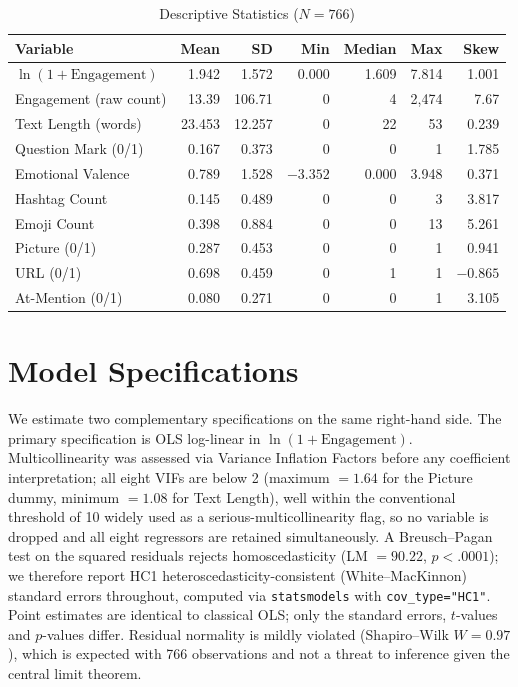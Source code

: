 \documentclass[12pt,a4paper]{article}
\begin{document}
\begin{table}[H]
\centering\small
\caption{Descriptive Statistics ($N=766$)}
\begin{tabular}{lrrrrrr}
\toprule
Variable & Mean & SD & Min & Median & Max & Skew \\
\midrule
$\ln(1+\text{Engagement})$ & 1.942 & 1.572 & 0.000 & 1.609 & 7.814 & 1.001 \\
Engagement (raw count) & 13.39 & 106.71 & 0 & 4 & 2{,}474 & 7.67 \\
Text Length (words) & 23.453 & 12.257 & 0 & 22 & 53 & 0.239 \\
Question Mark (0/1) & 0.167 & 0.373 & 0 & 0 & 1 & 1.785 \\
Emotional Valence & 0.789 & 1.528 & $-3.352$ & 0.000 & 3.948 & 0.371 \\
Hashtag Count & 0.145 & 0.489 & 0 & 0 & 3 & 3.817 \\
Emoji Count & 0.398 & 0.884 & 0 & 0 & 13 & 5.261 \\
Picture (0/1) & 0.287 & 0.453 & 0 & 0 & 1 & 0.941 \\
URL (0/1) & 0.698 & 0.459 & 0 & 1 & 1 & $-0.865$ \\
At-Mention (0/1) & 0.080 & 0.271 & 0 & 0 & 1 & 3.105 \\
\bottomrule
\end{tabular}
\end{table}

\section{Model Specifications}

We estimate two complementary specifications on the same right-hand side. The primary specification is OLS log-linear in $\ln(1+\text{Engagement})$. Multicollinearity was assessed via Variance Inflation Factors before any coefficient interpretation; all eight VIFs are below 2 (maximum $=1.64$ for the Picture dummy, minimum $=1.08$ for Text Length), well within the conventional threshold of 10 widely used as a serious-multicollinearity flag, so no variable is dropped and all eight regressors are retained simultaneously. A Breusch--Pagan test on the squared residuals rejects homoscedasticity (LM $=90.22$, $p<.0001$); we therefore report HC1 heteroscedasticity-consistent (White--MacKinnon) standard errors throughout, computed via \texttt{statsmodels} with \texttt{cov\_type="HC1"}. Point estimates are identical to classical OLS; only the standard errors, $t$-values and $p$-values differ. Residual normality is mildly violated (Shapiro--Wilk $W=0.97$), which is expected with 766 observations and not a threat to inference given the central limit theorem.
\end{document}
